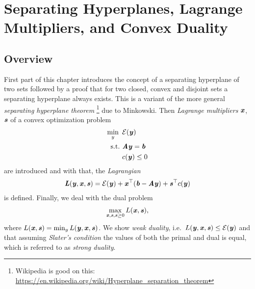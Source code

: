 \chapter{Separating Hyperplanes, Lagrange Multipliers, and Convex Duality}
%
%




%

\sloppy

\section{Overview}
First part of this chapter introduces the concept of a separating hyperplane of two sets followed by a proof that for two closed, convex and disjoint sets a separating hyperplane always exists.
This is a variant of the more general \emph{separating hyperplane theorem}%
\footnote{Wikipedia is good on this: \href{https://en.wikipedia.org/wiki/Hyperplane_separation_theorem}{https://en.wikipedia.org/wiki/Hyperplane\_separation\_theorem}} %
due to Minkowski.
Then \emph{Lagrange multipliers} $\xx$, $\ss$ of a convex optimization
problem
\begin{align*}
    \min_y{}\ & \energy(\yy) \\ \nonumber
\text{s.t.}\  & \AA\yy = \bb \\ \nonumber
              & c(\yy) \leq 0
\end{align*}
are introduced and with that, the \emph{Lagrangian} \begin{equation*} \LL(\yy, \xx, \ss) = \energy(\yy) + \xx^{\trp}(\bb - \AA\yy) + \ss^{\trp}c(\yy) \end{equation*}
is defined.
Finally, we deal with the dual problem
\begin{align*}
     \max_{\xx, \ss, \ss \geq 0}{} L(\xx,  \ss),
\end{align*}
where $L(\xx, \ss) = \min_y L(\yy, \xx, \ss)$. We show \emph{weak
  duality}, i.e.\ $L(\yy, \xx, \ss) \leq \energy(\yy)$ and that assuming \emph{Slater's condition} the values of both the primal and dual is equal, which is referred to as \emph{strong duality}.


